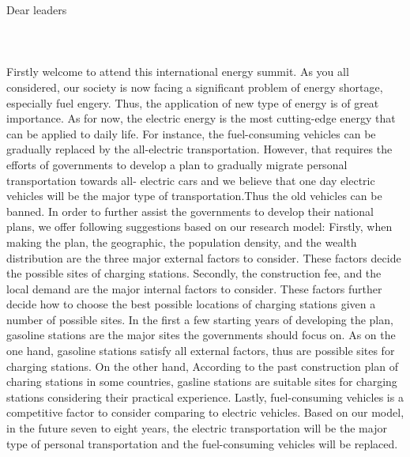 \begin{summary}
Dear leaders\\
\\
\\
\\
Firstly welcome to attend this international energy summit. As you all considered, our society is now facing a significant problem of energy shortage, especially fuel engery. Thus, the application of new type of energy is of great importance. As for now, the electric energy is the most cutting-edge energy that can be applied to daily life. For instance, the fuel-consuming vehicles can be gradually replaced by the all-electric transportation. However, that requires the efforts of governments to develop a plan to gradually migrate personal transportation towards all- electric cars and we believe that one day electric vehicles will be the major type of transportation.Thus the old vehicles can be banned. In order to further assist the governments to develop their national plans, we offer following suggestions based on our research model:
 Firstly, when making the plan, the geographic, the population density, and the wealth distribution are the three major external factors to consider. These factors decide the possible sites of charging stations.
Secondly, the construction fee, and the local demand are the major internal factors to consider. These factors further decide how to choose the best possible locations of charging stations given a number of possible sites.
In the first a few starting years of developing the plan, gasoline stations are the major sites the governments should focus on. As on the one hand, gasoline stations satisfy all external factors, thus are possible sites for charging stations. On the other hand, According to the past construction plan of charing stations in some countries, gasline stations are suitable sites for charging stations considering their practical experience.
Lastly, fuel-consuming vehicles is a competitive factor to consider comparing to electric vehicles. Based on our model, in the future seven to eight years, the electric transportation will be the major type of personal transportation and the fuel-consuming vehicles will be replaced.

\end{summary}
